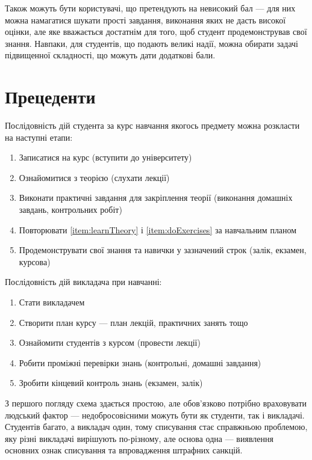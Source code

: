 Також можуть бути користувачі, що претендують на невисокий бал --- для них
можна намагатися шукати прості завдання, виконання яких не дасть високої
оцінки, але яке вважається достатнім для того, щоб студент продемонстрував свої
знання. Навпаки, для студентів, що подають великі надії, можна обирати
задачі підвищенної складності, що можуть дати додаткові бали.

\section{Прецеденти}
\label{section:precedences}


Послідовність дій студента за курс навчання якогось предмету можна розкласти
на наступні етапи:
\begin{enumerate}
    \item
        Записатися на курс (вступити до університету)
    \item\label{item:learnTheory}
        Ознайомитися з теорією (слухати лекції)
    \item\label{item:doExercises}
        Виконати практичні завдання для закріплення теорії
        (виконання домашніх завдань, контрольних робіт)
    \item
        Повторювати \ref{item:learnTheory} і \ref{item:doExercises} за
        навчальним планом
    \item
        Продемонструвати свої знання та навички у зазначений строк
        (залік, екзамен, курсова)
\end{enumerate}

Послідовність дій викладача при навчанні:
\begin{enumerate}
    \item
        Стати викладачем
    \item
        Створити план курсу --- план лекцій, практичних занять тощо
    \item
        Ознайомити студентів з курсом (провести лекції)
    \item
        Робити проміжні перевірки знань (контрольні, домашні завдання)
    \item
        Зробити кінцевий контроль знань (екзамен, залік)
\end{enumerate}

З першого погляду схема здається простою, але обов’язково потрібно враховувати
людський фактор --- недобросовісними можуть бути як студенти, так і викладачі.
Студентів багато, а викладач один, тому списування стає справжньою проблемою,
яку різні викладачі вирішують по-різному, але основа одна --- виявлення
основних ознак списування та впровадження штрафних санкцій.

